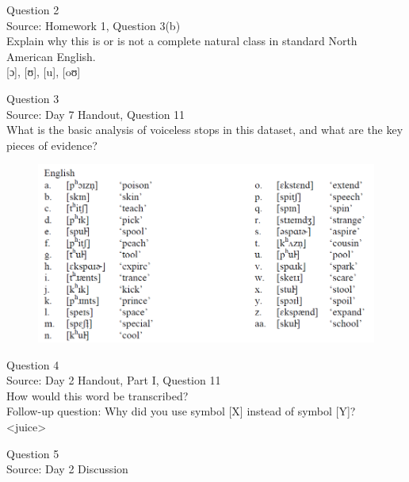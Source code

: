 \documentclass[12pt]{article}
\begin{document}
\newpage

{\large Question 2}\\

Source: Homework 1, Question 3(b)\\

Explain why this is or is not a complete natural class in standard North American English.\\

{[ɔ]}, {[ʊ]}, {[u]}, {[oʊ]}


\newpage

{\large Question 3}\\

Source: Day 7 Handout, Question 11\\

What is the basic analysis of voiceless stops in this dataset, and what are the key pieces of evidence?\\

\begin{figure}[H]
\includegraphics{../images/english11.png}
\end{figure}

\newpage

{\large Question 4}\\

Source: Day 2 Handout, Part I, Question 11\\

How would this word be transcribed?\\ Follow-up question: Why did you use symbol [X] instead of symbol [Y]?\\

<juice>


\newpage

{\large Question 5}\\

Source: Day 2 Discussion\\
\end{document}
